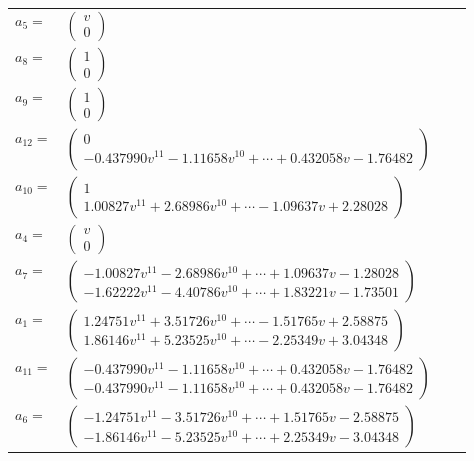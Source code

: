 \documentclass[1p]{elsarticle_modified}
\theoremstyle{definition}
\begin{document}
\begin{tabular}{m{7pt} m{180pt} m{7pt} m{180pt} }
\flushright $a_{5}=$&$\begin{pmatrix}v\\0\end{pmatrix}$ \\
\flushright $a_{8}=$&$\begin{pmatrix}1\\0\end{pmatrix}$ \\
\flushright $a_{9}=$&$\begin{pmatrix}1\\0\end{pmatrix}$ \\
\flushright $a_{12}=$&$\begin{pmatrix}0\\-0.437990 v^{11}-1.11658 v^{10}+\cdots+0.432058 v-1.76482\end{pmatrix}$ \\
\flushright $a_{10}=$&$\begin{pmatrix}1\\1.00827 v^{11}+2.68986 v^{10}+\cdots-1.09637 v+2.28028\end{pmatrix}$ \\
\flushright $a_{4}=$&$\begin{pmatrix}v\\0\end{pmatrix}$ \\
\flushright $a_{7}=$&$\begin{pmatrix}-1.00827 v^{11}-2.68986 v^{10}+\cdots+1.09637 v-1.28028\\-1.62222 v^{11}-4.40786 v^{10}+\cdots+1.83221 v-1.73501\end{pmatrix}$ \\
\flushright $a_{1}=$&$\begin{pmatrix}1.24751 v^{11}+3.51726 v^{10}+\cdots-1.51765 v+2.58875\\1.86146 v^{11}+5.23525 v^{10}+\cdots-2.25349 v+3.04348\end{pmatrix}$ \\
\flushright $a_{11}=$&$\begin{pmatrix}-0.437990 v^{11}-1.11658 v^{10}+\cdots+0.432058 v-1.76482\\-0.437990 v^{11}-1.11658 v^{10}+\cdots+0.432058 v-1.76482\end{pmatrix}$ \\
\flushright $a_{6}=$&$\begin{pmatrix}-1.24751 v^{11}-3.51726 v^{10}+\cdots+1.51765 v-2.58875\\-1.86146 v^{11}-5.23525 v^{10}+\cdots+2.25349 v-3.04348\end{pmatrix}$ \\

\end{tabular}
\end{document}
